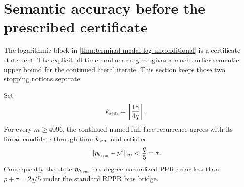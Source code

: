 \section{Semantic accuracy before the prescribed certificate}
\label{sec:terminal-modal-semantic-stop}

The logarithmic block in \cref{thm:terminal-modal-log-unconditional} is a
certificate statement.  The explicit all-time nonlinear regime gives a much
earlier semantic upper bound for the continued literal iterate.  This section
keeps those two stopping notions separate.

\begin{theorem}
\label{thm:terminal-modal-semantic-stop}
Set
\begin{equation}
 k_{\rm sem}=\left\lceil\frac{15}{4q}\right\rceil.
 \label{eq:terminal-modal-semantic-stop-time}
\end{equation}
For every $m\ge4096$, the continued named full-face recurrence agrees with
its linear candidate through time $k_{\rm sem}$ and satisfies
\begin{equation}
 \lVert p_{k_{\rm sem}}-p^\star\rVert_\infty<\frac q5=\tau.
 \label{eq:terminal-modal-semantic-stop}
\end{equation}
Consequently the state $p_{k_{\rm sem}}$ has degree-normalized PPR error less
than $\rho+\tau=2q/5$ under the standard RPPR bias bridge.
\end{theorem}

